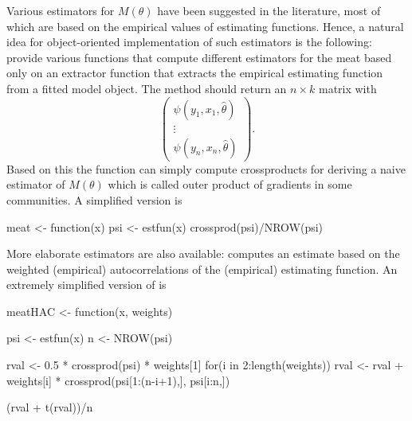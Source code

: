 \documentclass{Z}
\begin{document}
Various estimators for $M(\theta)$ have been suggested in the literature, most of which
are based on the empirical values of estimating functions. Hence, a natural idea
for object-oriented implementation of such estimators is the following: provide various 
functions that compute different estimators for the meat based only on an
 extractor function that extracts the empirical estimating function
from a fitted model object. The  method should return
an $n \times k$ matrix with
 \[ \left( \begin{array}{c} \psi(y_1, x_1, \hat \theta) \\ \vdots \\ \psi(y_n, x_n, \hat \theta)
    \end{array} \right). \]
Based on this the function  can simply compute crossproducts for deriving a naive
estimator of $M(\theta)$ which is called outer product of gradients in some communities.
A simplified version is
\begin{Schunk}
\begin{Sinput}
meat <- function(x)
{
  psi <- estfun(x)
  crossprod(psi)/NROW(psi)
}
\end{Sinput}
\end{Schunk}

More elaborate estimators are also available:  computes an estimate based on the
weighted (empirical) autocorrelations of the (empirical) estimating function. An extremely simplified
version of  is
\begin{Schunk}
\begin{Sinput}
meatHAC <- function(x, weights)
{
  psi <- estfun(x)
  n <- NROW(psi)

  rval <- 0.5 * crossprod(psi) * weights[1]
  for(i in 2:length(weights))
    rval <- rval + weights[i] * crossprod(psi[1:(n-i+1),], psi[i:n,])
  
  (rval + t(rval))/n
}
\end{Sinput}
\end{Schunk}
\end{document}
